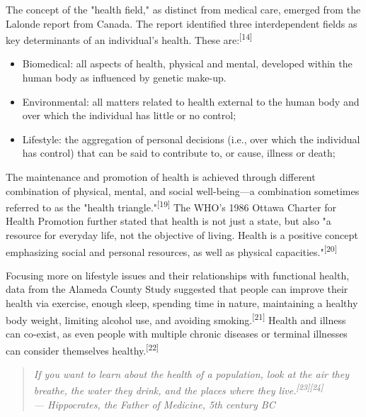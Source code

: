 The concept of the "health field," as distinct from medical care, emerged from the Lalonde report from Canada. The report identified three interdependent fields as key determinants of an individual's health. These are:\textsuperscript{[14]}

\begin{itemize}\setlength{\itemsep}{0pt}
\item Biomedical: all aspects of health, physical and mental, developed within the human body as influenced by genetic make-up.
\item Environmental: all matters related to health external to the human body and over which the individual has little or no control;
\item Lifestyle: the aggregation of personal decisions (i.e., over which the individual has control) that can be said to contribute to, or cause, illness or death;
\end{itemize}

The maintenance and promotion of health is achieved through different combination of physical, mental, and social well-being—a combination sometimes referred to as the "health triangle."\textsuperscript{[19]} The WHO's 1986 Ottawa Charter for Health Promotion further stated that health is not just a state, but also "a resource for everyday life, not the objective of living. Health is a positive concept emphasizing social and personal resources, as well as physical capacities."\textsuperscript{[20]}

Focusing more on lifestyle issues and their relationships with functional health, data from the Alameda County Study suggested that people can improve their health via exercise, enough sleep, spending time in nature, maintaining a healthy body weight, limiting alcohol use, and avoiding smoking.\textsuperscript{[21]} Health and illness can co-exist, as even people with multiple chronic diseases or terminal illnesses can consider themselves healthy.\textsuperscript{[22]}

\begin{quote}\itshape If you want to learn about the health of a population, look at the air they breathe, the water they drink, and the places where they live.\textsuperscript{[23]}\textsuperscript{[24]}
\\\upshape --- Hippocrates, the Father of Medicine, 5th century BC\end{quote}

